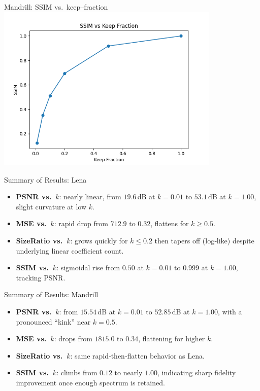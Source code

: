 \documentclass[12pt]{beamer}
\begin{document}
\begin{frame}{Mandrill: SSIM vs.\ keep–fraction}
  \centering
  \includegraphics[width=0.8\textwidth]{ssim_vs_keep_Mandrill.png}
\end{frame}


\begin{frame}{Summary of Results: Lena}
  \begin{itemize}
    \item \textbf{PSNR vs.\ \(k\)}: nearly linear, from \(19.6\)\,dB at \(k=0.01\) to \(53.1\)\,dB at \(k=1.00\), slight curvature at low \(k\).
    \item \textbf{MSE vs.\ \(k\)}: rapid drop from \(712.9\) to \(0.32\), flattens for \(k\ge0.5\).
    \item \textbf{SizeRatio vs.\ \(k\)}: grows quickly for \(k\le0.2\) then tapers off (log‐like) despite underlying linear coefficient count.
    \item \textbf{SSIM vs.\ \(k\)}: sigmoidal rise from \(0.50\) at \(k=0.01\) to \(0.999\) at \(k=1.00\), tracking PSNR.
  \end{itemize}
\end{frame}

\begin{frame}{Summary of Results: Mandrill}
  \begin{itemize}
    \item \textbf{PSNR vs.\ \(k\)}: from \(15.54\)\,dB at \(k=0.01\) to \(52.85\)\,dB at \(k=1.00\), with a pronounced “kink” near \(k=0.5\).
    \item \textbf{MSE vs.\ \(k\)}: drops from \(1815.0\) to \(0.34\), flattening for higher \(k\).
    \item \textbf{SizeRatio vs.\ \(k\)}: same rapid‐then‐flatten behavior as Lena.
    \item \textbf{SSIM vs.\ \(k\)}: climbs from \(0.12\) to nearly \(1.00\), indicating sharp fidelity improvement once enough spectrum is retained.
  \end{itemize}
\end{frame}
\end{document}

